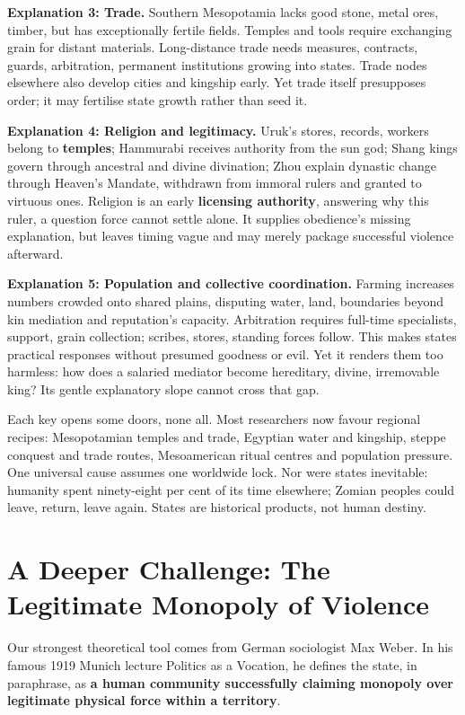 \textbf{Explanation 3: Trade.} Southern Mesopotamia lacks good stone, metal ores, timber, but has exceptionally fertile fields. Temples and tools require exchanging grain for distant materials. Long-distance trade needs measures, contracts, guards, arbitration, permanent institutions growing into states. Trade nodes elsewhere also develop cities and kingship early. Yet trade itself presupposes order; it may fertilise state growth rather than seed it.

\textbf{Explanation 4: Religion and legitimacy.} Uruk's stores, records, workers belong to \textbf{temples}; Hammurabi receives authority from the sun god; Shang kings govern through ancestral and divine divination; Zhou explain dynastic change through Heaven's Mandate, withdrawn from immoral rulers and granted to virtuous ones. Religion is an early \textbf{licensing authority}, answering why this ruler, a question force cannot settle alone. It supplies obedience's missing explanation, but leaves timing vague and may merely package successful violence afterward.

\textbf{Explanation 5: Population and collective coordination.} Farming increases numbers crowded onto shared plains, disputing water, land, boundaries beyond kin mediation and reputation's capacity. Arbitration requires full-time specialists, support, grain collection; scribes, stores, standing forces follow. This makes states practical responses without presumed goodness or evil. Yet it renders them too harmless: how does a salaried mediator become hereditary, divine, irremovable king? Its gentle explanatory slope cannot cross that gap.

Each key opens some doors, none all. Most researchers now favour regional recipes: Mesopotamian temples and trade, Egyptian water and kingship, steppe conquest and trade routes, Mesoamerican ritual centres and population pressure. One universal cause assumes one worldwide lock. Nor were states inevitable: humanity spent ninety-eight per cent of its time elsewhere; Zomian peoples could leave, return, leave again. States are historical products, not human destiny.

\section[Further Challenge: Legitimate Force]{A Deeper Challenge: The Legitimate Monopoly of Violence}
Our strongest theoretical tool comes from German sociologist Max Weber. In his famous 1919 Munich lecture Politics as a Vocation, he defines the state, in paraphrase, as \textbf{a human community successfully claiming monopoly over legitimate physical force within a territory}.

